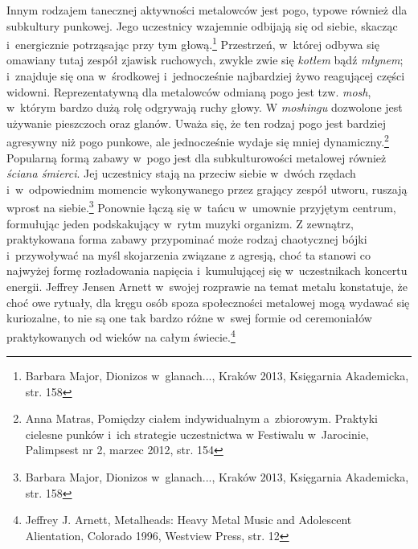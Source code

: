 \documentclass[12pt, a4paper, titlepage]{report}
\begin{document}
Innym rodzajem tanecznej aktywności metalowców jest pogo, typowe również dla subkultury punkowej. Jego uczestnicy wzajemnie odbijają się od siebie, skacząc i~energicznie potrząsając przy tym głową.\footnote{Barbara Major, Dionizos w~glanach..., Kraków 2013, Księgarnia Akademicka, str. 158} Przestrzeń, w~której odbywa się omawiany tutaj zespół zjawisk ruchowych, zwykle zwie się \textit{kotłem} bądź \textit{młynem}; i~znajduje się ona w~środkowej i~jednocześnie najbardziej żywo reagującej części widowni. Reprezentatywną dla metalowców odmianą pogo jest tzw. \textit{mosh}, w~którym bardzo dużą rolę odgrywają ruchy głowy. W \textit{moshingu} dozwolone jest używanie pieszczoch oraz glanów. Uważa się, że ten rodzaj pogo jest bardziej agresywny niż pogo punkowe, ale jednocześnie wydaje się mniej dynamiczny.\footnote{Anna Matras, Pomiędzy ciałem indywidualnym a~zbiorowym. Praktyki cielesne punków i~ich strategie uczestnictwa w Festiwalu w~Jarocinie, Palimpsest nr 2, marzec 2012, str. 154} Popularną formą zabawy w~pogo jest dla subkulturowości metalowej również \textit{ściana śmierci}. Jej uczestnicy stają na przeciw siebie w~dwóch rzędach i~w~odpowiednim momencie wykonywanego przez grający zespół utworu, ruszają wprost na siebie.\footnote{Barbara Major, Dionizos w~glanach..., Kraków 2013, Księgarnia Akademicka, str. 158} Ponownie łączą się w~tańcu w~umownie przyjętym centrum, formułując jeden podskakujący w~rytm muzyki organizm. Z zewnątrz, praktykowana forma zabawy przypominać może rodzaj chaotycznej bójki i~przywoływać na myśl skojarzenia związane z agresją, choć ta stanowi co najwyżej formę rozładowania napięcia i~kumulującej się w~uczestnikach koncertu energii. Jeffrey Jensen Arnett w~swojej rozprawie na temat metalu konstatuje, że choć owe rytuały, dla kręgu osób spoza społeczności metalowej mogą wydawać się kuriozalne, to nie są one tak bardzo różne w~swej formie od ceremoniałów praktykowanych od wieków na całym świecie.\footnote{Jeffrey J. Arnett, Metalheads: Heavy Metal Music and Adolescent Alientation, Colorado 1996, Westview Press, str. 12} 
\end{document}
